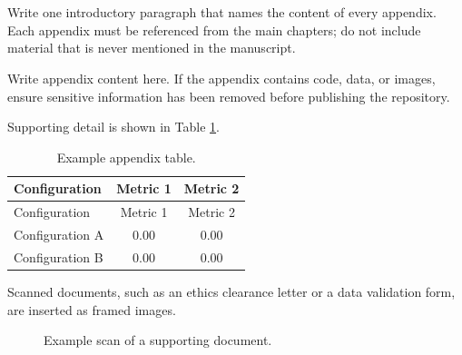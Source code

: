 \appendix
\ThesisPageBreak
{}
{}
\chapter*{\AppendixLabel}

\setcounter{table}{0}
\setcounter{figure}{0}
\renewcommand{\thetable}{A.\arabic{table}}
\renewcommand{\thefigure}{A.\arabic{figure}}


Write one introductory paragraph that names the content of every appendix. Each appendix must be referenced from the main chapters; do not include material that is never mentioned in the manuscript.


\label{sec:appendix-example}
Write appendix content here. If the appendix contains code, data, or images, ensure sensitive information has been removed before publishing the repository.

\label{sec:appendix-example-sub}
Supporting detail is shown in Table \ref{tab:appendix-example}.

\begin{longtable}{|l|c|c|}
\caption{Example appendix table.}\label{tab:appendix-example}\\
\hline
Configuration & Metric 1 & Metric 2 \\
\hline
\endfirsthead
\hline
Configuration & Metric 1 & Metric 2 \\
\hline
\endhead
\hline
\endlastfoot
Configuration A & 0.00 & 0.00 \\
\hline
Configuration B & 0.00 & 0.00 \\
\end{longtable}

\label{sec:appendix-documents}
Scanned documents, such as an ethics clearance letter or a data validation form, are inserted as framed images.

\begin{figure}[H]
\centering
{}
\caption{Example scan of a supporting document.}
\label{fig:appendix-documents}
\end{figure}
